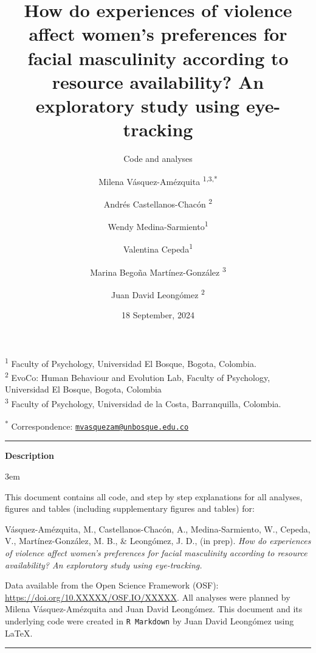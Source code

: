 \documentclass[
  bookmarksnumbered]{article}
\title{How do experiences of violence affect women's preferences for facial masculinity according to resource availability? An exploratory study using eye-tracking}
\subtitle{Code and analyses}
\author{Milena Vásquez-Amézquita \orcidlink{0000-0001-7317-8430}\textsuperscript{1,3,*} \and Andrés Castellanos-Chacón \orcidlink{0000-0003-1684-9319}\textsuperscript{2} \and Wendy Medina-Sarmiento\textsuperscript{1} \and Valentina Cepeda\textsuperscript{1} \and Marina Begoña Martínez-González \orcidlink{0000-0002-5840-6383}\textsuperscript{3} \and Juan David Leongómez \orcidlink{0000-0002-0092-6298}\textsuperscript{2}}
\date{18 September, 2024}
\begin{document}
\maketitle

\textsuperscript{1} Faculty of Psychology, Universidad El Bosque, Bogota, Colombia.\\
\textsuperscript{2} EvoCo: Human Behaviour and Evolution Lab, Faculty of Psychology, Universidad El Bosque, Bogota, Colombia\\
\textsuperscript{3} Faculty of Psychology, Universidad de la Costa, Barranquilla, Colombia.

\textsuperscript{*} Correspondence: \href{mailto:mvasquezam@unbosque.edu.co}{\href{mailto:mvasquezam@unbosque.edu.co}{\nolinkurl{mvasquezam@unbosque.edu.co}}}

\begin{center}\rule{0.5\linewidth}{0.5pt}\end{center}

\begin{center}
\textbf{Description}
\end{center}

\par
\begingroup
\leftskip3em
\rightskip\leftskip

This document contains all code, and step by step explanations for all analyses, figures and tables (including supplementary figures and tables) for:

\begin{hangparas}{.25in}{1}
Vásquez-Amézquita, M., Castellanos-Chacón, A., Medina-Sarmiento, W., Cepeda, V., Martínez-González, M. B., \& Leongómez, J. D.,  (in prep). \textit{How do experiences of violence affect women's preferences for facial masculinity according to resource availability? An exploratory study using eye-tracking.}
\end{hangparas}

Data available from the Open Science Framework (OSF): \url{https://doi.org/10.XXXXX/OSF.IO/XXXXX}. All analyses were planned by Milena Vásquez-Amézquita and Juan David Leongómez. This document and its underlying code were created in \texttt{R\ Markdown} by Juan David Leongómez using \LaTeX.

\begin{center}\rule{0.5\linewidth}{0.5pt}\end{center}

\par
\endgroup

{\hypersetup{hidelinks}
\setcounter{tocdepth}{6}
\tableofcontents
}
\opensupplement
\end{document}
